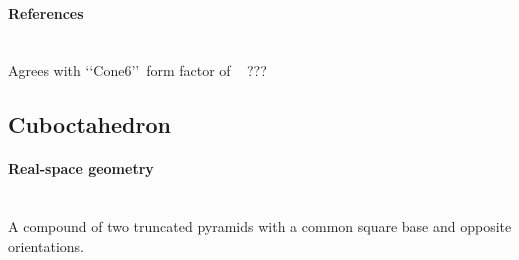 \paragraph{References}\strut\\
Agrees with \lq\lq Cone6\rq\rq\ form factor of \IsGISAXS~\cite{Laz02} ???

\clearpage
\subsection{Cuboctahedron} \label{sec:Cuboctahedron}

\paragraph{Real-space geometry}\strut\\
A compound of two truncated pyramids with a common square base
and opposite orientations.

\begin{figure}[h]
\hfill
{}
\hfill
{}
\hfill
\end{figure}

